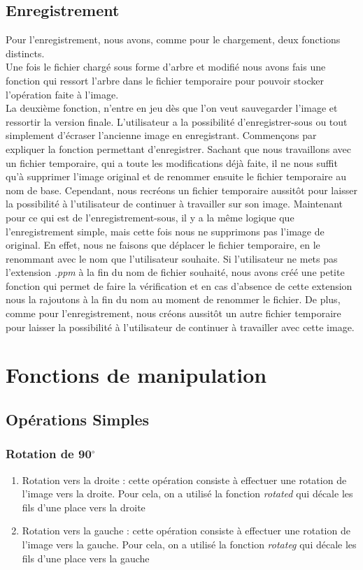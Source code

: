 \documentclass[12pt]{article}
\begin{document}
\subsection{Enregistrement}
Pour l'enregistrement, nous avons, comme pour le chargement, deux fonctions distincts. \\
Une fois le fichier chargé sous forme d'arbre et modifié nous avons fais une fonction qui ressort l'arbre dans le fichier temporaire pour pouvoir stocker l'opération faite à l'image.\\
La deuxième fonction, n'entre en jeu dès que l'on veut sauvegarder l'image et ressortir la version finale. L'utilisateur a la possibilité d'enregistrer-sous ou tout simplement d'écraser l'ancienne image en enregistrant. Commençons par expliquer la fonction permettant d'enregistrer. Sachant que nous travaillons avec un fichier temporaire, qui a toute les modifications déjà faite, il ne nous suffit qu'à supprimer l'image original et de renommer ensuite le fichier temporaire au nom de base. Cependant, nous recréons un fichier temporaire aussitôt pour laisser la possibilité à l'utilisateur de continuer à travailler sur son image. Maintenant pour ce qui est de l'enregistrement-sous, il y a la même logique que l'enregistrement simple, mais cette fois nous ne supprimons pas l'image de original. En effet, nous ne faisons que déplacer le fichier temporaire, en le renommant avec le nom que l'utilisateur souhaite. Si l'utilisateur ne mets pas l'extension \textit{.ppm} à la fin du nom de fichier souhaité, nous avons créé une petite fonction qui permet de faire la vérification et en cas d'absence de cette extension nous la rajoutons à la fin du nom au moment de renommer le fichier. De plus, comme pour l'enregistrement, nous créons aussitôt un autre fichier temporaire pour laisser la possibilité à l'utilisateur de continuer à travailler avec cette image.
\section{Fonctions de manipulation}
\subsection{Opérations Simples}
\subsubsection{Rotation de 90$^{\circ}$}
\begin{enumerate}
\item Rotation vers la droite : cette opération consiste à effectuer une rotation de l'image vers la droite. Pour cela, on a utilisé la fonction \textit{rotated} qui décale les fils d'une place vers la droite	
\item Rotation vers la gauche : cette opération consiste à effectuer une rotation de l'image vers la gauche. Pour cela, on a utilisé la fonction \textit{rotateg} qui décale les fils d'une place vers la gauche   
\end{enumerate}
\end{document}
